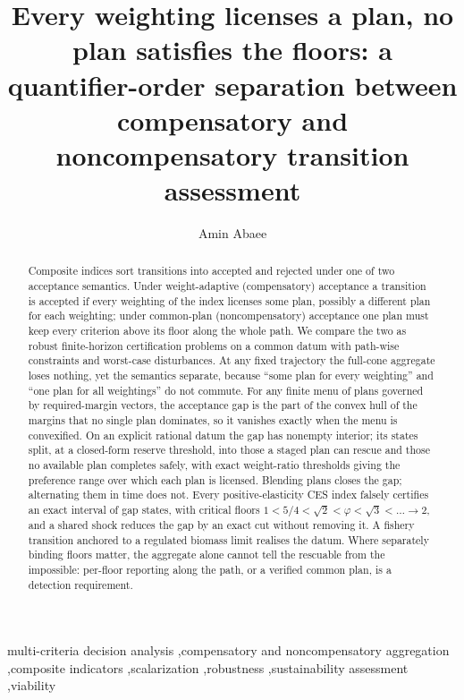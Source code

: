 \documentclass[preprint,11pt,authoryear]{elsarticle}
\theoremstyle{definition}
\theoremstyle{remark}
\begin{document}
\begin{frontmatter}

\title{Every weighting licenses a plan, no plan satisfies the floors: a quantifier-order separation between compensatory and noncompensatory transition assessment}

\author[1]{Amin Abaee}

\begin{abstract}
Composite indices sort transitions into accepted and rejected under one of two acceptance semantics. Under weight-adaptive (compensatory) acceptance a transition is accepted if every weighting of the index licenses some plan, possibly a different plan for each weighting; under common-plan (noncompensatory) acceptance one plan must keep every criterion above its floor along the whole path. We compare the two as robust finite-horizon certification problems on a common datum with path-wise constraints and worst-case disturbances. At any fixed trajectory the full-cone aggregate loses nothing, yet the semantics separate, because ``some plan for every weighting'' and ``one plan for all weightings'' do not commute. For any finite menu of plans governed by required-margin vectors, the acceptance gap is the part of the convex hull of the margins that no single plan dominates, so it vanishes exactly when the menu is convexified. On an explicit rational datum the gap has nonempty interior; its states split, at a closed-form reserve threshold, into those a staged plan can rescue and those no available plan completes safely, with exact weight-ratio thresholds giving the preference range over which each plan is licensed. Blending plans closes the gap; alternating them in time does not. Every positive-elasticity CES index falsely certifies an exact interval of gap states, with critical floors $1<5/4<\sqrt2<\varphi<\sqrt3<\dots\to2$, and a shared shock reduces the gap by an exact cut without removing it. A fishery transition anchored to a regulated biomass limit realises the datum. Where separately binding floors matter, the aggregate alone cannot tell the rescuable from the impossible: per-floor reporting along the path, or a verified common plan, is a detection requirement.
\end{abstract}

\begin{keyword}
multi-criteria decision analysis \sep compensatory and noncompensatory aggregation \sep composite indicators \sep scalarization \sep robustness \sep sustainability assessment \sep viability
\end{keyword}

\end{frontmatter}
\end{document}
